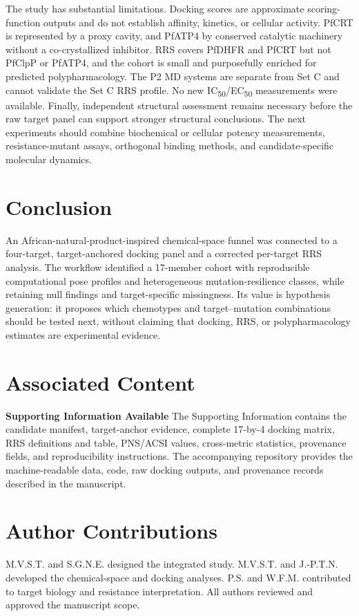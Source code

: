 \documentclass[journal=jcisd8,manuscript=article]{achemso}
\begin{document}
The study has substantial limitations. Docking scores are approximate scoring-function outputs and do not establish affinity, kinetics, or cellular activity. PfCRT is represented by a proxy cavity, and PfATP4 by conserved catalytic machinery without a co-crystallized inhibitor. RRS covers PfDHFR and PfCRT but not PfClpP or PfATP4, and the cohort is small and purposefully enriched for predicted polypharmacology. The P2 MD systems are separate from Set C and cannot validate the Set C RRS profile. No new IC\textsubscript{50}/EC\textsubscript{50} measurements were available. Finally, independent structural assessment remains necessary before the raw target panel can support stronger structural conclusions. The next experiments should combine biochemical or cellular potency measurements, resistance-mutant assays, orthogonal binding methods, and candidate-specific molecular dynamics.

\section{Conclusion}
An African-natural-product-inspired chemical-space funnel was connected to a four-target, target-anchored docking panel and a corrected per-target RRS analysis. The workflow identified a 17-member cohort with reproducible computational pose profiles and heterogeneous mutation-resilience classes, while retaining null findings and target-specific missingness. Its value is hypothesis generation: it proposes which chemotypes and target--mutation combinations should be tested next, without claiming that docking, RRS, or polypharmacology estimates are experimental evidence.

\section*{Associated Content}
\textbf{Supporting Information Available}
The Supporting Information contains the candidate manifest, target-anchor evidence, complete 17-by-4 docking matrix, RRS definitions and table, PNS/ACSI values, cross-metric statistics, provenance fields, and reproducibility instructions. The accompanying repository provides the machine-readable data, code, raw docking outputs, and provenance records described in the manuscript.

\section*{Author Contributions}
M.V.S.T. and S.G.N.E. designed the integrated study. M.V.S.T. and J.-P.T.N. developed the chemical-space and docking analyses. P.S. and W.F.M. contributed to target biology and resistance interpretation. All authors reviewed and approved the manuscript scope.
\end{document}
